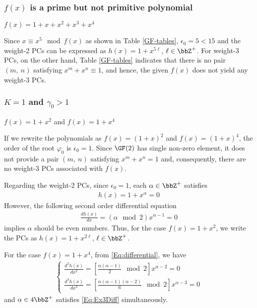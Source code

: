 \subsubsection{$f(x)$ is a prime but not primitive polynomial}

\begin{example}
$f(x)=1+x+x^2+x^3+x^4$

Since $x\equiv x^5 \mod f(x)$ as shown in Table \ref{GF-tables}, $\epsilon_0=5< 15$ and the weight-2 PCs can be expressed as $h(x)=1+x^{5\ell}$, $\ell \in \bbZ^+$. For weight-3 PCs, on the other hand, Table \ref{GF-tables} indicates that there is no pair $(m,~n)$ satisfying $x^m+x^n \equiv 1$, and hence, the given $f(x)$ does not yield any weight-3 PCs.
\label{Ex:3}
\end{example}

\subsubsection{$K=1$ and $\gamma_0 > 1$}
\begin{example}
	$f(x)=1+x^2$ and $f(x)=1+x^4$\newline
	
	If we rewrite the polynomials as $f(x)=(1+x)^2$ and $f(x)=(1+x)^4$,	the order of the root $\varphi_0$ is $\epsilon_0=1$. Since $\GF(2)$ has single non-zero element, it does not provide a pair $(m,~n)$ satisfying $x^m+x^n = 1$ and, consequently, there are no weight-3 PCs associated with $f(x)$.
	
	Regarding the weight-2 PCs, since $\epsilon_0 = 1$, each $\alpha \in \bbZ^+$ satisfies
	\begin{align}
		h(x) = 1+x^\alpha = 0
	\end{align}
	However, the following second order differential equation
	\begin{align}
	\frac{dh(x)}{dx} = (\alpha\mod 2) x^{\alpha-1} = 0
	\end{align}
	implies $\alpha$ should be even numbers. Thus, for the case $f(x) = 1+x^2$, we write the PCs as  $h(x)=1+x^{2\ell}$, $\ell \in \bbZ^+$.
	

	For the case $f(x) = 1+x^4$, from \eqref{Eq:differential}, we have
	\begin{align}
		\begin{cases}
		\frac{d^2h(x)}{dx^2} = \left[\frac{\alpha(\alpha-1)}{2} \mod 2\right]x^{\alpha-2} = 0 \\
		\frac{d^3h(x)}{dx^3} = \left[\frac{\alpha(\alpha-1)(\alpha-2)}{6} \mod 2\right]x^{\alpha-3} = 0
		\end{cases}
		\label{Eq:Ex3Diff}
	\end{align}
	and $\alpha \in 4\bbZ^+$ satisfies \eqref{Eq:Ex3Diff} simultaneously.
\label{Ex:4}
\end{example}

